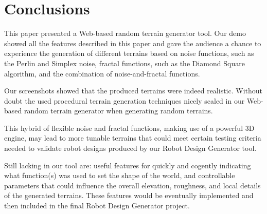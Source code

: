 \section{Conclusions} %
\label{sec:conclusions}

This paper presented a Web-based random terrain generator tool. Our demo showed all the features described in this paper and gave the audience a chance to experience the generation of different terrains based on noise functions, such as the Perlin and Simplex noise, fractal functions, such as the Diamond Square algorithm, and the combination of noise-and-fractal functions. 

Our screenshots showed that the produced terrains were indeed realistic. Without doubt the used procedural terrain generation techniques nicely scaled in our Web-based random terrain generator when generating random terrains. 

This hybrid of flexible noise and fractal functions, making use of a powerful 3D engine, may lead to more tunable terrains that could meet certain testing criteria needed to validate robot designs produced by our Robot Design Generator tool. 

Still lacking in our tool are: useful features for quickly and cogently indicating what function(s) was used to set the shape of the world, and controllable parameters that could influence the overall elevation, roughness, and local details of the generated terrains. These features would be eventually implemented and then included in the final Robot Design Generator project. 


